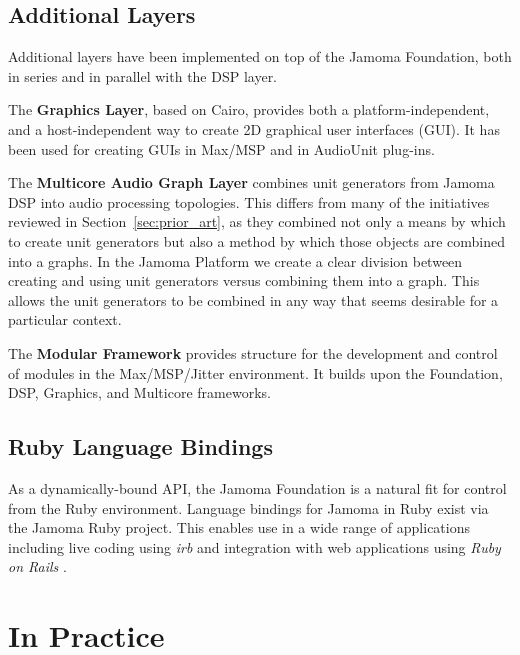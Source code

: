 \documentclass[twoside,10pt]{article}
\begin{document}


\subsection{Additional Layers} %

Additional layers have been implemented on top of the Jamoma Foundation, both in series and in parallel with the DSP layer.  

The \textbf{Graphics Layer}\cite{web10}, based on Cairo\cite{web11}, provides both a platform-independent, and a host-independent way to create 2D graphical user interfaces (GUI). It has been used for creating GUIs in Max/MSP and in AudioUnit plug-ins.

The \textbf{Multicore Audio Graph Layer}\cite{web12} combines unit generators from Jamoma DSP into audio processing topologies.  This differs from many of the initiatives reviewed in Section~\ref{sec:prior_art}, as they combined not only a means by which to create unit generators but also a method by which those objects are combined into a graphs.  In the Jamoma Platform we create a clear division between creating and using unit generators versus combining them into a graph.  This allows the unit generators to be combined in any way that seems desirable for a particular context.

The \textbf{Modular Framework}\cite{web13} provides structure for the development and control of modules in the Max/MSP/Jitter environment.  It builds upon the Foundation, DSP, Graphics, and Multicore frameworks.



\subsection{Ruby Language Bindings} %

As a dynamically-bound API, the Jamoma Foundation is a natural fit for control from the Ruby environment.  Language bindings for Jamoma in Ruby exist via the Jamoma Ruby project\cite{web14}.  This enables use in a wide range of applications including live coding using \emph{irb} \cite{web15} and integration with web applications using \emph{Ruby on Rails} \cite{web16}.




\section{In Practice} %
\end{document}
